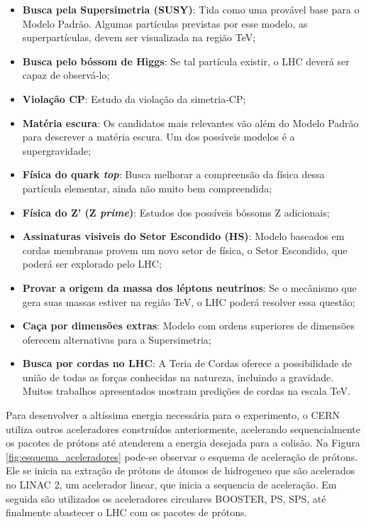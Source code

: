 \begin{itemize}
\item \textbf{Busca pela Supersimetria (SUSY)}: Tida como uma provável base para o Modelo
Padrão\cite{Intro_Standard}. Algumas partículas previstas por esse modelo, as superpartículas, 
devem ser visualizada na região TeV;
\item \textbf{Busca pelo bóssom de Higgs}: Se tal partícula existir, o LHC deverá ser capaz de
observá-lo;
\item \textbf{Violação CP}: Estudo da violação da simetria-CP;
\item \textbf{Matéria escura}: Os candidatos mais relevantes vão além do Modelo
Padrão para descrever a matéria escura. Um dos possíveis modelos é a supergravidade;
\item \textbf{Física do quark \emph{top}}: Busca melhorar a compreensão da física dessa
partícula elementar, ainda não muito bem compreendida;
\item \textbf{Física do Z' (Z \emph{prime})}: Estudos dos possíveis bóssoms Z adicionais; 
\item \textbf{Assinaturas visiveis do Setor Escondido (HS)}: Modelo baseados em cordas
membranas provem um novo setor de física, o Setor Escondido, que poderá ser
explorado pelo LHC;
\item \textbf{Provar a origem da massa dos léptons neutrinos}: Se o mecânismo que gera
suas massas estiver na região TeV, o LHC poderá resolver essa questão;
\item \textbf{Caça por dimensões extras}: Modelo com ordens superiores de dimensões
oferecem alternativas para a Supersimetria;
\item \textbf{Busca por cordas no LHC}: A Teria de Cordas oferece a possibilidade de
união de todas as forças conhecidas na natureza, incluindo a gravidade. Muitos
trabalhos apresentados mostram predições de cordas na escala TeV.
\end{itemize}

Para desenvolver a altíssima energia necessária para o experimento, o CERN 
utiliza outros aceleradores construídos anteriormente, acelerando
sequencialmente os pacotes de prótons até atenderem
a energia desejada para a colisão. Na Figura \ref{fig:esquema_aceleradores} pode-se observar
o esquema de aceleração de prótons. Ele se inicia na extração de prótons de átomos
de hidrogeneo que são acelerados no LINAC 2, um acelerador linear,
que inicia a sequencia de aceleração. Em seguida são utilizados os aceleradores
circulares BOOSTER, PS, SPS, até finalmente abastecer o LHC com os pacotes de
prótons.

